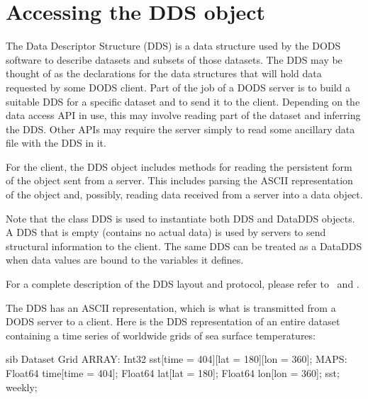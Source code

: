 \documentclass{dods-paper}
\begin{document}


\section{Accessing the DDS object}
\label{client-tut,implementing}

The Data Descriptor Structure (DDS) is a data structure used by the
DODS software to describe datasets and subsets of those datasets. The
DDS may be thought of as the declarations for the data structures that
will hold data requested by some DODS client. Part of the job of a
DODS server is to build a suitable DDS for a specific dataset and to
send it to the client. Depending on the data access API in use, this
may involve reading part of the dataset and inferring the DDS.  Other
APIs may require the server simply to read some ancillary data file
with the DDS in it.

For the client, the DDS object includes methods for reading the
persistent form of the object sent from a server. This includes
parsing the ASCII representation of the object and, possibly, reading
data received from a server into a data object.

Note that the class DDS is used to instantiate both DDS and DataDDS objects.
A DDS that is empty (contains no actual data) is used by servers to send
structural information to the client. The same DDS can be treated as a
DataDDS when data values are bound to the variables it defines.

For a complete description of the DDS layout and protocol, please
refer to \OPDuser\ and \OPDapi .

The DDS has an ASCII representation, which is what is transmitted from
a DODS server to a client. Here is the DDS representation of an entire
dataset containing a time series of worldwide grids of sea surface
temperatures:

\begin{vcode}{sib}
Dataset {
    Grid {
      ARRAY:
	 Int32 sst[time = 404][lat = 180][lon = 360];
      MAPS:
	 Float64 time[time = 404];
	 Float64 lat[lat = 180];
	 Float64 lon[lon = 360];
    } sst;
} weekly;
\end{vcode}
       
\end{document}
